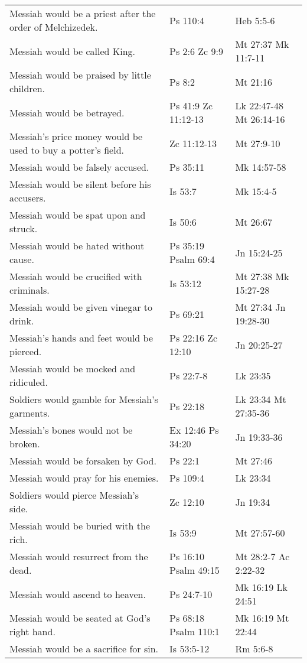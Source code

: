 \documentclass[11pt]{article}
\begin{document}
\begin{center}
\begin{tabular}{lll}
Messiah would be a priest after the order of Melchizedek. & Ps 110:4 & Heb 5:5-6\\[0pt]
Messiah would be called King. & Ps 2:6 Zc 9:9 & Mt 27:37 Mk 11:7-11\\[0pt]
Messiah would be praised by little children. & Ps 8:2 & Mt 21:16\\[0pt]
Messiah would be betrayed. & Ps 41:9 Zc 11:12-13 & Lk 22:47-48 Mt 26:14-16\\[0pt]
Messiah's price money would be used to buy a potter's field. & Zc 11:12-13 & Mt 27:9-10\\[0pt]
Messiah would be falsely accused. & Ps 35:11 & Mk 14:57-58\\[0pt]
Messiah would be silent before his accusers. & Is 53:7 & Mk 15:4-5\\[0pt]
Messiah would be spat upon and struck. & Is 50:6 & Mt 26:67\\[0pt]
Messiah would be hated without cause. & Ps 35:19 Psalm 69:4 & Jn 15:24-25\\[0pt]
Messiah would be crucified with criminals. & Is 53:12 & Mt 27:38 Mk 15:27-28\\[0pt]
Messiah would be given vinegar to drink. & Ps 69:21 & Mt 27:34 Jn 19:28-30\\[0pt]
Messiah's hands and feet would be pierced. & Ps 22:16 Zc 12:10 & Jn 20:25-27\\[0pt]
Messiah would be mocked and ridiculed. & Ps 22:7-8 & Lk 23:35\\[0pt]
Soldiers would gamble for Messiah's garments. & Ps 22:18 & Lk 23:34 Mt 27:35-36\\[0pt]
Messiah's bones would not be broken. & Ex 12:46 Ps 34:20 & Jn 19:33-36\\[0pt]
Messiah would be forsaken by God. & Ps 22:1 & Mt 27:46\\[0pt]
Messiah would pray for his enemies. & Ps 109:4 & Lk 23:34\\[0pt]
Soldiers would pierce Messiah's side. & Zc 12:10 & Jn 19:34\\[0pt]
Messiah would be buried with the rich. & Is 53:9 & Mt 27:57-60\\[0pt]
Messiah would resurrect from the dead. & Ps 16:10 Psalm 49:15 & Mt 28:2-7 Ac 2:22-32\\[0pt]
Messiah would ascend to heaven. & Ps 24:7-10 & Mk 16:19 Lk 24:51\\[0pt]
Messiah would be seated at God's right hand. & Ps 68:18 Psalm 110:1 & Mk 16:19 Mt 22:44\\[0pt]
Messiah would be a sacrifice for sin. & Is 53:5-12 & Rm 5:6-8\\[0pt]
\end{tabular}
\end{center}
\end{document}
